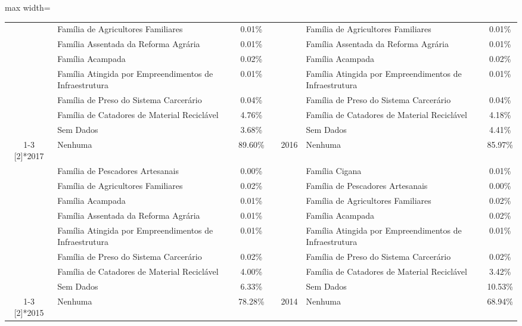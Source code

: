 \documentclass[14pt]{extarticle}
\begin{document}
\begin{table}[htbp]
\begin{adjustbox}{max width=\linewidth}
\begin{tabular}{clcrclc}
         & Família de Agricultores Familiares & 0.01\% &      &      & Família de Agricultores Familiares & 0.01\% \\
         & Família Assentada da Reforma Agrária & 0.01\% &      &      & Família Assentada da Reforma Agrária & 0.01\% \\
         & Família Acampada & 0.02\% &      &      & Família Acampada & 0.02\% \\
         & Família Atingida por Empreendimentos de Infraestrutura & 0.01\% &      &      & Família Atingida por Empreendimentos de Infraestrutura & 0.01\% \\
         & Família de Preso do Sistema Carcerário & 0.04\% &      &      & Família de Preso do Sistema Carcerário & 0.04\% \\
         & Família de Catadores de Material Reciclável & 4.76\% &      &      & Família de Catadores de Material Reciclável & 4.18\% \\
         & Sem Dados & 3.68\% &      &      & Sem Dados & 4.41\% \\
\cmidrule{1-3}\cmidrule{5-7}    \multirow{9}[2]{*}{2017} & Nenhuma & 89.60\% &      & \multirow{9}[2]{*}{2016} & Nenhuma & 85.97\% \\
         & Família de Pescadores Artesanais & 0.00\% &      &      & Família Cigana & 0.01\% \\
         & Família de Agricultores Familiares & 0.02\% &      &      & Família de Pescadores Artesanais & 0.00\% \\
         & Família Acampada & 0.01\% &      &      & Família de Agricultores Familiares & 0.02\% \\
         & Família Assentada da Reforma Agrária & 0.01\% &      &      & Família Acampada & 0.02\% \\
         & Família Atingida por Empreendimentos de Infraestrutura & 0.01\% &      &      & Família Atingida por Empreendimentos de Infraestrutura & 0.01\% \\
         & Família de Preso do Sistema Carcerário & 0.02\% &      &      & Família de Preso do Sistema Carcerário & 0.02\% \\
         & Família de Catadores de Material Reciclável & 4.00\% &      &      & Família de Catadores de Material Reciclável & 3.42\% \\
         & Sem Dados & 6.33\% &      &      & Sem Dados & 10.53\% \\
\cmidrule{1-3}\cmidrule{5-7}    \multirow{9}[2]{*}{2015} & Nenhuma & 78.28\% &      & \multirow{9}[2]{*}{2014} & Nenhuma & 68.94\% \\

\end{tabular}
\end{adjustbox}
\end{table}
\end{document}
